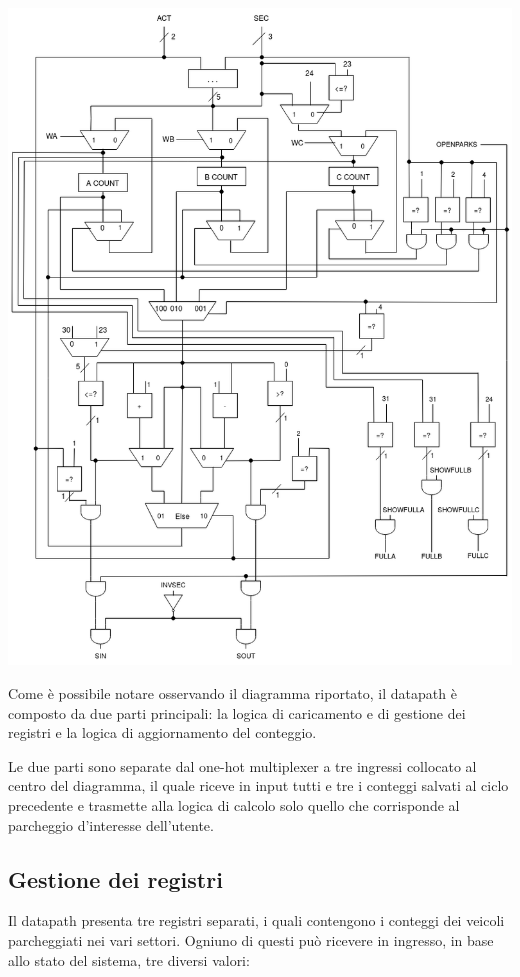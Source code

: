 \documentclass[
  12pt,
  a4paper,
  headings=optiontoheadandtoc
]{scrreprt}
\begin{document}
\Centering
\includegraphics[scale=0.5]{datapath}

\RaggedRight

Come è possibile notare osservando il diagramma riportato, il datapath è composto da due parti principali: la logica di caricamento e di gestione dei registri e la logica di aggiornamento del conteggio.

Le due parti sono separate dal one-hot multiplexer a tre ingressi collocato al centro del diagramma, il quale riceve in input tutti e tre i conteggi salvati al ciclo precedente e trasmette alla logica di calcolo solo quello che corrisponde al parcheggio d'interesse dell'utente.

\subsection[nonumber=true]{Gestione dei registri}

Il datapath presenta tre registri separati, i quali contengono i conteggi dei veicoli parcheggiati nei vari settori. Ogniuno di questi può ricevere in ingresso, in base allo stato del sistema, tre diversi valori:
\end{document}
